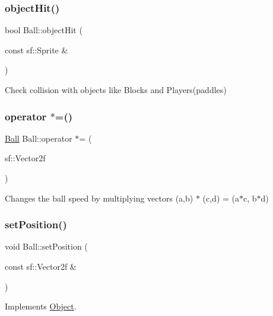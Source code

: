 \subsubsection{\texorpdfstring{objectHit()}{objectHit()}}
{\footnotesize\ttfamily bool Ball\+::object\+Hit (\begin{DoxyParamCaption}\item[{const sf\+::\+Sprite \&}]{ }\end{DoxyParamCaption})}



Check collision with objects like Blocks and Players(paddles) 

\mbox{\label{class_ball_a41fb0c62d108caa6e20573598030c648}} 
\subsubsection{\texorpdfstring{operator $\ast$=()}{operator *=()}}
{\footnotesize\ttfamily \mbox{\hyperlink{class_ball}{Ball}} Ball\+::operator $\ast$= (\begin{DoxyParamCaption}\item[{sf\+::\+Vector2f}]{ }\end{DoxyParamCaption})}



Changes the ball speed by multiplying vectors (a,b) $\ast$ (c,d) = (a$\ast$c, b$\ast$d) 

\mbox{\label{class_ball_af2260b5f0b9b20d4974ada97481004f3}} 
\subsubsection{\texorpdfstring{setPosition()}{setPosition()}}
{\footnotesize\ttfamily void Ball\+::set\+Position (\begin{DoxyParamCaption}\item[{const sf\+::\+Vector2f \&}]{ }\end{DoxyParamCaption})\hspace{0.3cm}{\ttfamily [virtual]}}



Implements \mbox{\hyperlink{class_object_ac5c796bfa75dedf6d3bfc74685b2b77d}{Object}}.

\mbox{\label{class_ball_ad82f5f35eaf987d5c2b0faabd06989c5}} 
